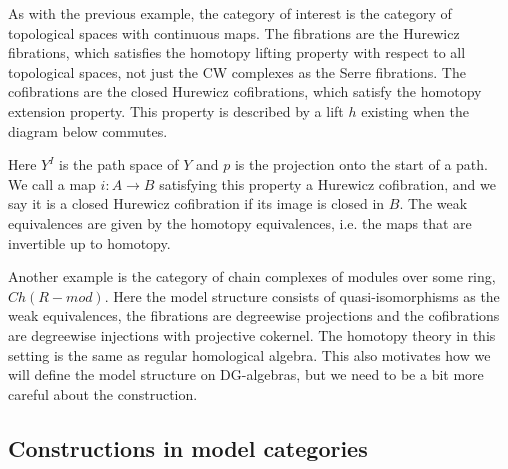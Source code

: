 \begin{example}
As with the previous example, the category of interest is the category of topological spaces with continuous maps. The fibrations are the Hurewicz fibrations, which satisfies the homotopy lifting property with respect to all topological spaces, not just the CW complexes as the Serre fibrations. The cofibrations are the closed Hurewicz cofibrations, which satisfy the homotopy extension property. This property is described by a lift $h$ existing when the diagram below commutes.

\begin{center}
\end{center}

Here $Y^I$ is the path space of $Y$ and $p$ is the projection onto the start of a path. We call a map $i:A\longrightarrow B$ satisfying this property a Hurewicz cofibration, and we say it is a closed Hurewicz cofibration if its image is closed in $B$. The weak equivalences are given by the homotopy equivalences, i.e. the maps that are invertible up to homotopy.  
\end{example}

\begin{example}
Another example is the category of chain complexes of modules over some ring, $Ch(R-mod)$. Here the model structure consists of quasi-isomorphisms as the weak equivalences, the fibrations are degreewise projections and the cofibrations are degreewise injections with projective cokernel. The homotopy theory in this setting is the same as regular homological algebra. This also motivates how we will define the model structure on DG-algebras, but we need to be a bit more careful about the construction. 
\end{example}



\subsection{Constructions in model categories}

